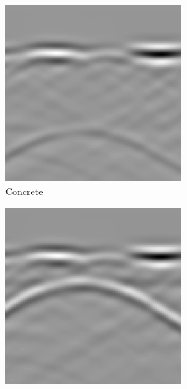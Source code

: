 \begin{figure}[H]
  \centering
  \begin{subfigure}[b]{0.4\linewidth}
    \includegraphics[width=\linewidth]{figures/sample_gprmax_bscan_concrete.png}
    \caption{Concrete}
  \end{subfigure}
  \begin{subfigure}[b]{0.4\linewidth}
    \includegraphics[width=\linewidth]{figures/metallic_bscan_gprmax.png}

\end{subfigure}
\end{figure}
